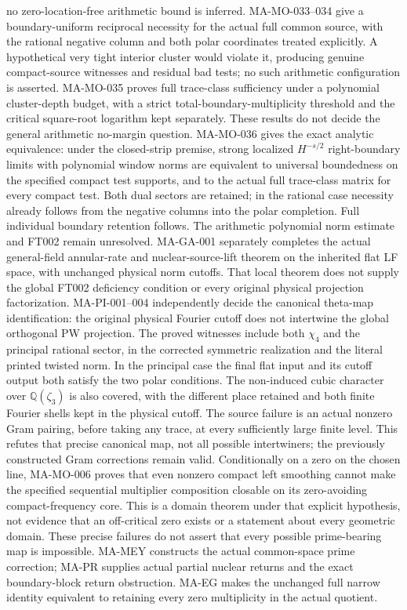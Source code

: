 \documentclass[11pt,a4paper]{article}
\begin{document}
no zero-location-free arithmetic bound is inferred.
MA-MO-033--034 give a boundary-uniform reciprocal necessity for
the actual full common source, with the rational negative column
and both polar coordinates treated explicitly. A hypothetical
very tight interior cluster would violate it, producing genuine
compact-source witnesses and residual bad tests; no such
arithmetic configuration is asserted. MA-MO-035 proves full
trace-class sufficiency under a polynomial cluster-depth budget,
with a strict total-boundary-multiplicity threshold and the
critical square-root logarithm kept separately. These results
do not decide the general arithmetic no-margin question.
MA-MO-036 gives the exact analytic equivalence: under the
closed-strip premise, strong localized $H^{-s/2}$ right-boundary
limits with polynomial window norms are equivalent to universal
boundedness on the specified compact test supports, and to the
actual full trace-class matrix for every compact test. Both dual
sectors are retained; in the rational case necessity already
follows from the negative columns into the polar completion.
Full individual boundary retention follows. The arithmetic
polynomial norm estimate and FT002 remain unresolved.
MA-GA-001 separately completes the actual
general-field annular-rate and nuclear-source-lift theorem on
the inherited flat LF space, with unchanged physical norm
cutoffs. That local theorem does not supply the global FT002
deficiency condition or every original physical projection
factorization.
MA-PI-001--004 independently decide the canonical theta-map
identification: the original physical Fourier cutoff does
not intertwine the global orthogonal PW projection. The
proved witnesses include both $\chi_4$ and the principal
rational sector, in the corrected symmetric realization
and the literal printed twisted norm. In the principal
case the final flat input and its cutoff output both
satisfy the two polar conditions. The non-induced cubic
character over $\mathbb Q(\zeta_3)$ is also covered,
with the different place retained and both finite Fourier
shells kept in the physical cutoff. The source failure is
an actual nonzero Gram pairing, before taking any trace,
at every sufficiently large finite level. This refutes
that precise canonical map, not all possible intertwiners;
the previously constructed Gram corrections remain valid.
Conditionally on a zero on the chosen line, MA-MO-006 proves
that even nonzero compact left smoothing cannot make the
specified sequential multiplier composition closable on its
zero-avoiding compact-frequency core. This is a domain theorem
under that explicit hypothesis, not evidence that an off-critical
zero exists or a statement about every geometric domain.
These precise failures do
not assert that every possible prime-bearing map is impossible.
MA-MEY constructs the actual common-space prime correction;
MA-PR supplies actual partial nuclear returns and the exact
boundary-block return obstruction. MA-EG makes the unchanged
full narrow identity equivalent to retaining every zero
multiplicity in the actual quotient.
\end{document}
